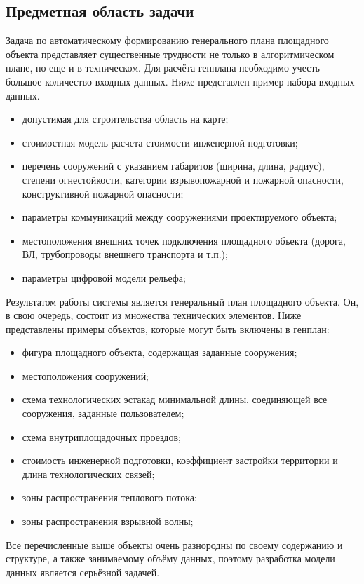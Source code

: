 \subsection{\Large{Предметная область задачи}}

Задача по автоматическому формированию генерального плана площадного объекта
представляет существенные трудности не только в алгоритмическом плане, но еще и в техническом.
Для расчёта генплана необходимо учесть большое количество входных данных.
Ниже представлен пример набора входных данных.
\begin{itemize}
    \item допустимая для строительства область на карте;
    \item стоимостная модель расчета стоимости инженерной подготовки;
    \item перечень сооружений с указанием габаритов (ширина, длина, радиус),
    степени огнестойкости, категории взрывопожарной и пожарной опасности, конструктивной пожарной опасности;
    \item параметры коммуникаций между сооружениями проектируемого объекта;
    \item местоположения внешних точек подключения площадного объекта (дорога, ВЛ, трубопроводы внешнего транспорта и т.п.);
    \item параметры цифровой модели рельефа;
\end{itemize}

Результатом работы системы является генеральный план площадного объекта.
Он, в свою очередь, состоит из множества технических элементов.
Ниже представлены примеры объектов, которые могут быть включены в генплан:
\begin{itemize}
    \item фигура площадного объекта, содержащая заданные сооружения;
    \item местоположения сооружений;
    \item схема технологических эстакад минимальной длины, соединяющей все сооружения, заданные пользователем;
    \item схема внутриплощадочных проездов;
    \item стоимость инженерной подготовки, коэффициент застройки территории и длина технологических связей;
    \item зоны распространения теплового потока;
    \item зоны распространения взрывной волны;
\end{itemize}

Все перечисленные выше объекты очень разнородны по своему содержанию и структуре, а также занимаемому объёму данных,
поэтому разработка модели данных является серьёзной задачей.